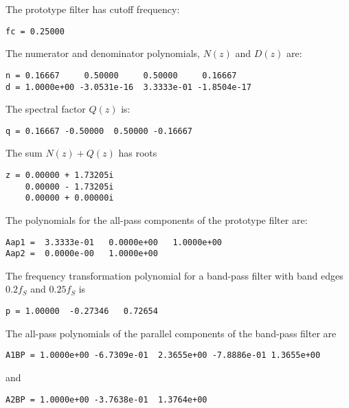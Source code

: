\documentclass[a4paper,twoside,10pt,english]{report}
\begin{document}
The prototype filter has cutoff frequency:
\begin{small}
\begin{verbatim}
fc = 0.25000
\end{verbatim}
\end{small}
The numerator and denominator polynomials, $N\left(z\right)$ and
$D\left(z\right)$ are:
\begin{small}
\begin{verbatim}
n = 0.16667     0.50000     0.50000     0.16667
d = 1.0000e+00 -3.0531e-16  3.3333e-01 -1.8504e-17
\end{verbatim}
\end{small}
The spectral factor $Q\left(z\right)$ is:
\begin{small}
\begin{verbatim}
q = 0.16667 -0.50000  0.50000 -0.16667
\end{verbatim}
\end{small}
The sum $N\left(z\right)+Q\left(z\right)$ has roots
\begin{small}
\begin{verbatim}
z = 0.00000 + 1.73205i    
    0.00000 - 1.73205i    
    0.00000 + 0.00000i
\end{verbatim}
\end{small}
The polynomials for the all-pass components of the prototype filter
are:
\begin{small}
\begin{verbatim}
Aap1 =  3.3333e-01   0.0000e+00   1.0000e+00
Aap2 =  0.0000e-00   1.0000e+00
\end{verbatim}
\end{small}
The frequency transformation polynomial for a band-pass filter with
band edges $0.2f_{S}$ and $0.25f_{S}$ is
\begin{small}
\begin{verbatim}
p = 1.00000  -0.27346   0.72654
\end{verbatim}
\end{small}
The all-pass polynomials of the parallel components of the band-pass
filter are
\begin{small}
\begin{verbatim}
A1BP = 1.0000e+00 -6.7309e-01  2.3655e+00 -7.8886e-01 1.3655e+00
\end{verbatim}
\end{small}
and
\begin{small}
\begin{verbatim}
A2BP = 1.0000e+00 -3.7638e-01  1.3764e+00
\end{verbatim}
\end{small}
\end{document}
